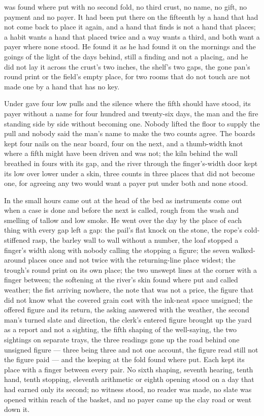 \scenebreak

 was found where put with no second fold, no third crust, no name, no gift, no payment and no payer. It had been put there on the fifteenth by a hand that had not come back to place it again, and a hand that finds is not a hand that places; a habit wants a hand that placed twice and a way wants a third, and both want a payer where none stood. He found it as he had found it on the mornings and the goings of the light of the days behind, still a finding and not a placing, and he did not lay it across the crust's two inches, the shelf's two gaps, the gone pan's round print or the field's empty place, for two rooms that do not touch are not made one by a hand that has no key.

Under   gave four low pulls and the silence where the fifth should have stood, its payer without a name for four hundred and twenty-six days, the man and the fire standing side by side without becoming one. Nobody lifted the floor to supply the pull and nobody said the man's name to make the two counts agree. The boards kept four nails on the near board, four on the next, and a thumb-width knot where a fifth might have been driven and was not; the kiln behind the wall breathed in fours with its gap, and the river through the finger's-width door kept its low over lower under a skin, three counts in three places that did not become one, for agreeing any two would want a payer put under both and none stood.

In the small hours  came out at the head of the bed as instruments come out when a case is done and before the next is called, rough from the wash and smelling of tallow and low smoke. He went over the day by the place of each thing with every gap left a gap: the pail's flat knock on the stone, the rope's cold-stiffened rasp, the barley wall to wall without a number, the loaf stopped a finger's width along with nobody calling the stopping a figure; the seven walked-around places once and not twice with the returning-line place widest; the trough's round print on its own place; the two unswept lines at the corner with a finger between; the softening at the river's skin found where put and called weather; the fist arriving nowhere, the note that was not a price, the figure that did not know what the covered grain cost with the ink-neat space unsigned; the offered figure and its return, the asking answered with the weather, the second man's turned slate and direction, the clerk's entered figure brought up the yard as a report and not a sighting, the fifth shaping of the well-saying, the two sightings on separate trays, the three readings gone up the road behind one unsigned figure --- three being three and not one account, the figure read still not the figure paid --- and the keeping at the fold found where put. Each kept its place with a finger between every pair. No sixth shaping, seventh hearing, tenth hand, tenth stopping, eleventh arithmetic or eighth opening stood on a day that had earned only its second; no witness stood, no reader was made, no slate was opened within reach of the basket, and no payer came up the clay road or went down it.

